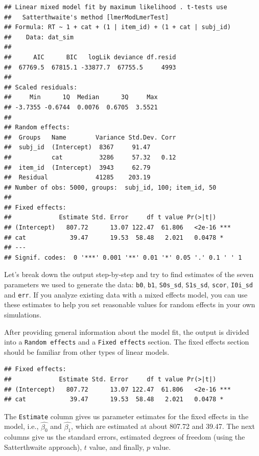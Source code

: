 \documentclass[doc,floatsintext]{apa6}
\begin{document}
\begin{verbatim}
## Linear mixed model fit by maximum likelihood . t-tests use
##   Satterthwaite's method [lmerModLmerTest]
## Formula: RT ~ 1 + cat + (1 | item_id) + (1 + cat | subj_id)
##    Data: dat_sim
## 
##      AIC      BIC   logLik deviance df.resid 
##  67769.5  67815.1 -33877.7  67755.5     4993 
## 
## Scaled residuals: 
##     Min      1Q  Median      3Q     Max 
## -3.7355 -0.6744  0.0076  0.6705  3.5521 
## 
## Random effects:
##  Groups   Name        Variance Std.Dev. Corr
##  subj_id  (Intercept)  8367     91.47       
##           cat          3286     57.32   0.12
##  item_id  (Intercept)  3943     62.79       
##  Residual             41285    203.19       
## Number of obs: 5000, groups:  subj_id, 100; item_id, 50
## 
## Fixed effects:
##             Estimate Std. Error     df t value Pr(>|t|)    
## (Intercept)   807.72      13.07 122.47  61.806   <2e-16 ***
## cat            39.47      19.53  58.48   2.021   0.0478 *  
## ---
## Signif. codes:  0 '***' 0.001 '**' 0.01 '*' 0.05 '.' 0.1 ' ' 1
\end{verbatim}

\noindent Let's break down the output step-by-step and try to find
estimates of the seven parameters we used to generate the data:
\texttt{b0}, \texttt{b1}, \texttt{S0s\_sd}, \texttt{S1s\_sd},
\texttt{scor}, \texttt{I0i\_sd} and \texttt{err}. If you analyze
existing data with a mixed effects model, you can use these estimates to
help you set reasonable values for random effects in your own
simulations.

After providing general information about the model fit, the output is
divided into a \texttt{Random\ effects} and a \texttt{Fixed\ effects}
section. The fixed effects section should be familiar from other types
of linear models.

\begin{verbatim}
## Fixed effects:
##             Estimate Std. Error     df t value Pr(>|t|)    
## (Intercept)   807.72      13.07 122.47  61.806   <2e-16 ***
## cat            39.47      19.53  58.48   2.021   0.0478 *
\end{verbatim}

\noindent The \texttt{Estimate} column gives us parameter estimates for
the fixed effects in the model, i.e., \(\hat{\beta_0}\) and
\(\hat{\beta_1}\), which are estimated at about 807.72 and 39.47. The
next columns give us the standard errors, estimated degrees of freedom
(using the Satterthwaite approach), \(t\) value, and finally, \(p\)
value.
\end{document}
